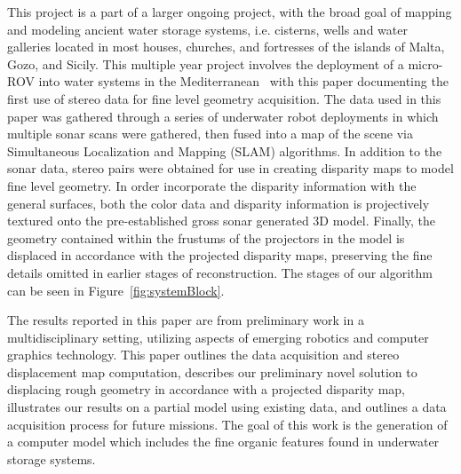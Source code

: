 \documentclass[a4paper,twoside]{article}
\begin{document}
This project is a part of a larger ongoing project, with the broad goal of mapping and modeling ancient water storage systems, i.e. cisterns, wells and water galleries located in most houses, churches, and fortresses of the islands of Malta, Gozo, and Sicily. This multiple year project involves the deployment of a micro-ROV into water systems in the Mediterranean~\cite{White10,ICEX11,McVicker,McVicker2} with this paper documenting the first use of stereo data for fine level geometry acquisition. The data used in this paper was gathered through a series of underwater robot deployments in which multiple sonar scans were gathered, then fused into a map of the scene via Simultaneous Localization and Mapping (SLAM) algorithms. In addition to the sonar data, stereo pairs were obtained for use in creating disparity maps to model fine level geometry. In order incorporate the disparity information with the general surfaces, both the color data and disparity information is projectively textured onto the pre-established gross sonar generated 3D model. Finally, the geometry contained within the frustums of the projectors in the model is displaced in accordance with the projected disparity maps, preserving the fine details omitted in earlier stages of reconstruction. The stages of our algorithm can be seen in Figure~\ref{fig:systemBlock}.


The results reported in this paper are from preliminary work in a multidisciplinary setting, utilizing aspects of emerging robotics and computer graphics technology.  This paper outlines the data acquisition and stereo displacement map computation, describes our preliminary novel solution to displacing rough geometry in accordance with a projected disparity map, illustrates our results on a partial model using existing data, and outlines a data acquisition process for future missions. The goal of this work is the generation of a computer model which includes the fine organic features found in underwater storage systems.
\end{document}
